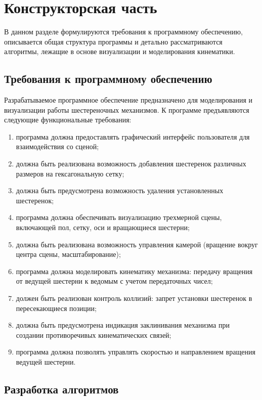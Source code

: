 \section{Конструкторская часть}

В данном разделе формулируются требования к программному обеспечению, описывается общая структура программы и детально рассматриваются алгоритмы, лежащие в основе визуализации и моделирования кинематики.

\subsection{Требования к программному обеспечению}

Разрабатываемое программное обеспечение предназначено для моделирования и визуализации работы шестереночных механизмов. К программе предъявляются следующие функциональные требования:
\begin{enumerate}
	\item программа должна предоставлять графический интерфейс пользователя для взаимодействия со сценой;
	\item должна быть реализована возможность добавления шестеренок различных размеров на гексагональную сетку;
	\item должна быть предусмотрена возможность удаления установленных шестеренок;
	\item программа должна обеспечивать визуализацию трехмерной сцены, включающей пол, сетку, оси и вращающиеся шестерни;
	\item должна быть реализована возможность управления камерой (вращение вокруг центра сцены, масштабирование);
	\item программа должна моделировать кинематику механизма: передачу вращения от ведущей шестерни к ведомым с учетом передаточных чисел;
	\item должен быть реализован контроль коллизий: запрет установки шестеренок в пересекающиеся позиции;
	\item должна быть предусмотрена индикация заклинивания механизма при создании противоречивых кинематических связей;
	\item программа должна позволять управлять скоростью и направлением вращения ведущей шестерни.
\end{enumerate}

\subsection{Разработка алгоритмов}


